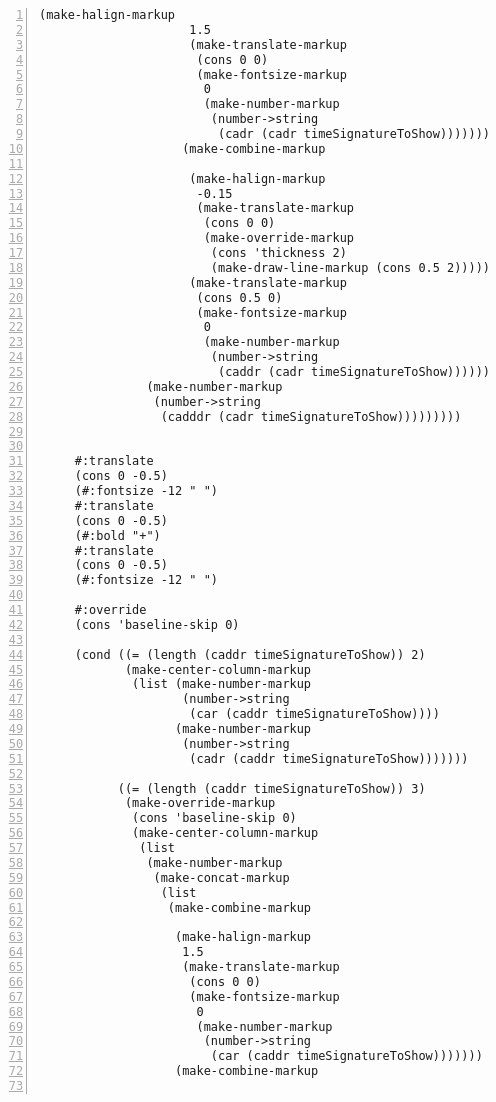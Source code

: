 \begin{Verbatim}[numbers=left,xleftmargin=5mm]
                    (make-halign-markup
                     1.5
                     (make-translate-markup
                      (cons 0 0)
                      (make-fontsize-markup
                       0
                       (make-number-markup
                        (number->string
                         (cadr (cadr timeSignatureToShow)))))))
                    (make-combine-markup

                     (make-halign-markup
                      -0.15
                      (make-translate-markup
                       (cons 0 0)
                       (make-override-markup
                        (cons 'thickness 2)
                        (make-draw-line-markup (cons 0.5 2)))))
                     (make-translate-markup
                      (cons 0.5 0)
                      (make-fontsize-markup
                       0
                       (make-number-markup
                        (number->string
                         (caddr (cadr timeSignatureToShow))))))))))))
               (make-number-markup
                (number->string
                 (cadddr (cadr timeSignatureToShow)))))))))


     #:translate
     (cons 0 -0.5)
     (#:fontsize -12 " ")
     #:translate
     (cons 0 -0.5)
     (#:bold "+")
     #:translate
     (cons 0 -0.5)
     (#:fontsize -12 " ")

     #:override
     (cons 'baseline-skip 0)

     (cond ((= (length (caddr timeSignatureToShow)) 2)
            (make-center-column-markup
             (list (make-number-markup
                    (number->string
                     (car (caddr timeSignatureToShow))))
                   (make-number-markup
                    (number->string
                     (cadr (caddr timeSignatureToShow)))))))

           ((= (length (caddr timeSignatureToShow)) 3)
            (make-override-markup
             (cons 'baseline-skip 0)
             (make-center-column-markup
              (list
               (make-number-markup
                (make-concat-markup
                 (list
                  (make-combine-markup

                   (make-halign-markup
                    1.5
                    (make-translate-markup
                     (cons 0 0)
                     (make-fontsize-markup
                      0
                      (make-number-markup
                       (number->string
                        (car (caddr timeSignatureToShow)))))))
                   (make-combine-markup


\end{Verbatim}
